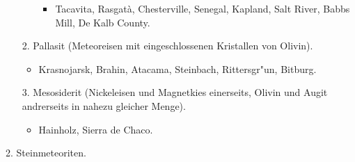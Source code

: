 \documentclass[a4paper, 11pt, oneside]{article}
\begin{document}
\begin{itemize}
\begin{itemize}
\begin{itemize}
            \item Tacavita, Rasgatà, Chesterville, Senegal, Kapland, Salt River, Babbs Mill, De Kalb County.
        \end{itemize}
    \end{itemize}
    \item[2.] Pallasit (Meteoreisen mit eingeschlossenen Kristallen von Olivin).
    \begin{itemize}
        \item Krasnojarsk, Brahin, Atacama, Steinbach, Rittersgr"un, Bitburg.
    \end{itemize}
    \item[3.] Mesosiderit (Nickeleisen und Magnetkies einerseits, Olivin und Augit andrerseits in nahezu gleicher Menge).
    \begin{itemize}
        \item Hainholz, Sierra de Chaco.
    \end{itemize}
\end{itemize}
\begin{center}
2. Steinmeteoriten.
\end{center}
\end{document}
